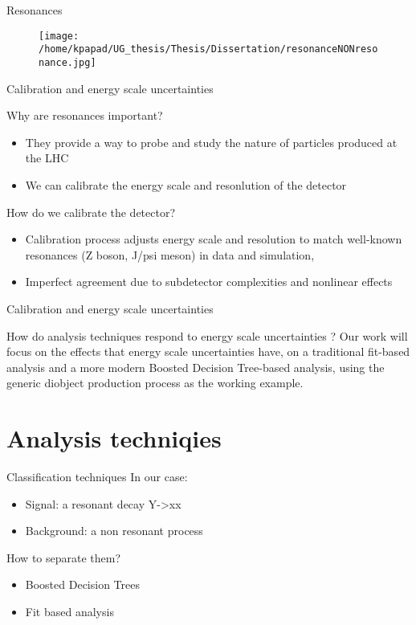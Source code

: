 \documentclass[bigger]{beamer}
\begin{document}
\begin{frame}[label={sec:org0b9763e}]{Resonances}
\begin{figure}[hb]
\centering
\texttt{[image: /home/kpapad/UG\_thesis/Thesis/Dissertation/resonanceNONresonance.jpg]}
\end{figure}
\end{frame}
\begin{frame}[label={sec:org22958b0}]{Calibration and energy scale uncertainties}
\begin{block}{Why are resonances important?}
\begin{itemize}
\item They provide a way to probe and study the nature of particles produced at the LHC
\item We can calibrate the energy scale and resonlution of the detector
\end{itemize}
\end{block}
\begin{block}{How do we calibrate the detector?}
\begin{itemize}
\item Calibration process adjusts energy scale and resolution to match well-known resonances (Z boson, J/psi meson) in data and simulation,
\end{itemize}
\begin{itemize}
\item Imperfect agreement due to subdetector complexities and nonlinear effects
\end{itemize}
\end{block}
\end{frame}

\begin{frame}[label={sec:org767410b}]{Calibration and energy scale uncertainties}
\begin{block}{How do analysis techniques respond to energy scale uncertainties ?}
Our work will focus on the effects that energy scale uncertainties have, on a traditional fit-based analysis and a more modern Boosted Decision Tree-based analysis, using the generic diobject production process as the working example.
\end{block}
\end{frame}

\section{Analysis techniqies}
\label{sec:orgc4df90c}
\begin{frame}[label={sec:org4af2fe8}]{Classification techniques}
\alert{In our case}:
\begin{itemize}
\item Signal: a resonant decay Y->xx
\item Background: a non resonant process
\end{itemize}
\alert{How to separate them?}
\begin{itemize}
\item Boosted Decision Trees
\item Fit based analysis
\end{itemize}
\end{frame}
\end{document}
